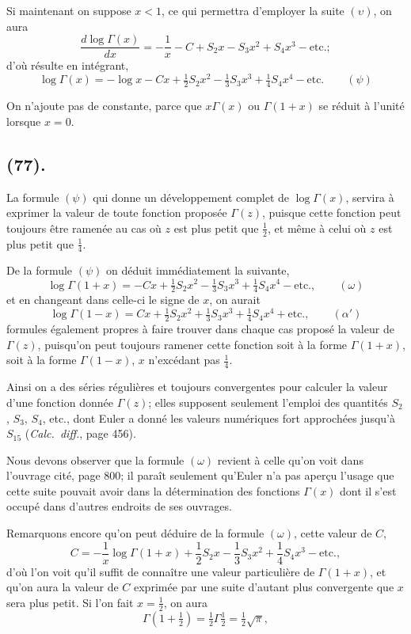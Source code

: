 \documentclass{article}
\begin{document}
Si maintenant on suppose $x<1$, ce qui permettra d'employer la suite $(\upsilon)$, on aura
\[ \frac{d\log\Gamma(x)}{dx}=-\frac{1}{x}-C+S_{2}x-S_{3}x^{2}+S_{4}x^{3}-\text{etc.}; \]
d'où résulte en intégrant,
\[ \log\Gamma(x)=-\log x-Cx+\tfrac{1}{2}S_{2}x^{2}-\tfrac{1}{3}S_{3}x^{3}+\tfrac{1}{4}S_{4}x^{4}-\text{etc.}\qquad(\psi) \]

On n'ajoute pas de constante, parce que $x\Gamma(x)$ ou $\Gamma(1+x)$ se réduit à l'unité lorsque $x=0$.

\subsection*{(77).}

La formule $(\psi)$ qui donne un développement complet de $\log\Gamma(x)$, servira à exprimer la valeur de toute fonction proposée $\Gamma(z)$, puisque cette fonction peut toujours être ramenée au cas où $z$ est plus petit que $\frac{1}{2}$, et même à celui où $z$ est plus petit que $\frac{1}{4}$.

De la formule $(\psi)$ on déduit immédiatement la suivante,
\[ \log\Gamma(1+x)=-Cx+\tfrac{1}{2}S_{2}x^{2}-\tfrac{1}{3}S_{3}x^{3}+\tfrac{1}{4}S_{4}x^{4}-\text{etc.},\qquad(\omega) \]
et en changeant dans celle-ci le signe de $x$, on aurait
\[ \log\Gamma(1-x)=Cx+\tfrac{1}{2}S_{2}x^{2}+\tfrac{1}{3}S_{3}x^{3}+\tfrac{1}{4}S_{4}x^{4}+\text{etc.},\qquad(\alpha') \]
formules également propres à faire trouver dans chaque cas proposé la valeur de $\Gamma(z)$, puisqu'on peut toujours ramener cette fonction soit à la forme $\Gamma(1+x)$, soit à la forme $\Gamma(1-x)$, $x$ n'excédant pas $\frac{1}{4}$.

Ainsi on a des séries régulières et toujours convergentes pour calculer la valeur d'une fonction donnée $\Gamma(z)$; elles supposent seulement l'emploi des quantités $S_{2}$, $S_{3}$, $S_{4}$, etc., dont Euler a donné les valeurs numériques fort approchées jusqu'à $S_{15}$ (\emph{Calc.\ diff.}, page 456).

Nous devons observer que la formule $(\omega)$ revient à celle qu'on voit dans l'ouvrage cité, page 800; il paraît seulement qu'Euler n'a pas aperçu l'usage que cette suite pouvait avoir dans la détermination des fonctions $\Gamma(x)$ dont il s'est occupé dans d'autres endroits de ses ouvrages.

Remarquons encore qu'on peut déduire de la formule $(\omega)$, cette valeur de $C$,
\[ C=-\frac{1}{x}\log\Gamma(1+x)+\frac{1}{2}S_{2}x-\frac{1}{3}S_{3}x^{2}+\frac{1}{4}S_{4}x^{3}-\text{etc.}, \]
d'où l'on voit qu'il suffit de connaître une valeur particulière de $\Gamma(1+x)$, et qu'on aura la valeur de $C$ exprimée par une suite d'autant plus convergente que $x$ sera plus petit. Si l'on fait $x=\frac{1}{2}$, on aura
\[ \Gamma\left(1+\tfrac{1}{2}\right)=\tfrac{1}{2}\Gamma\tfrac{1}{2}=\tfrac{1}{2}\sqrt{\pi}, \]
\end{document}
